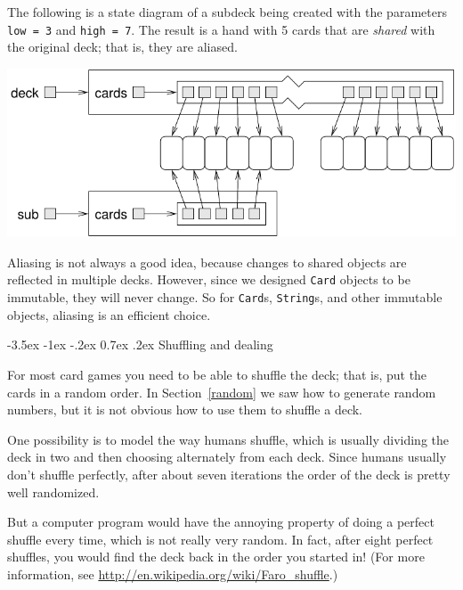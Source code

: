 \documentclass[12pt]{book}
\makeatletter
\theoremstyle{exercise}
\newcommand{\java}[1]{\verb"#1"}
\renewcommand{\section}{\@startsection{section}{1}{\z@}%
    {-3.5ex \@plus -1ex \@minus -.2ex}%
    {0.7ex \@plus.2ex}%
    {\normalfont\Large\bfseries}}
\newcommand{\java}[1]{\lstinline{#1}} %
\makeatother
\begin{document}
The following is a state diagram of a subdeck being created with the parameters \java{low = 3} and \java{high = 7}.
The result is a hand with 5 cards that are {\em shared} with the original deck; that is, they are aliased.

\begin{center}
\includegraphics{figs/subdeck.pdf}
\end{center}


Aliasing is not always a good idea, because changes to shared objects are reflected in multiple decks.
However, since we designed \java{Card} objects to be immutable, they will never change.
So for \java{Card}s, \java{String}s, and other immutable objects, aliasing is an efficient choice.


\section{Shuffling and dealing}
\label{shuffle}


For most card games you need to be able to shuffle the deck; that is, put the cards in a random order.
In Section~\ref{random} we saw how to generate random numbers, but it is not obvious how to use them to shuffle a deck.

One possibility is to model the way humans shuffle, which is usually dividing the deck in two and then choosing alternately from each deck.
Since humans usually don't shuffle perfectly, after about seven iterations the order of the deck is pretty well randomized.

But a computer program would have the annoying property of doing a perfect shuffle every time, which is not really very random.
In fact, after eight perfect shuffles, you would find the deck back in the order you started in!
(For more information, see \url{http://en.wikipedia.org/wiki/Faro_shuffle}.)

\end{document}
